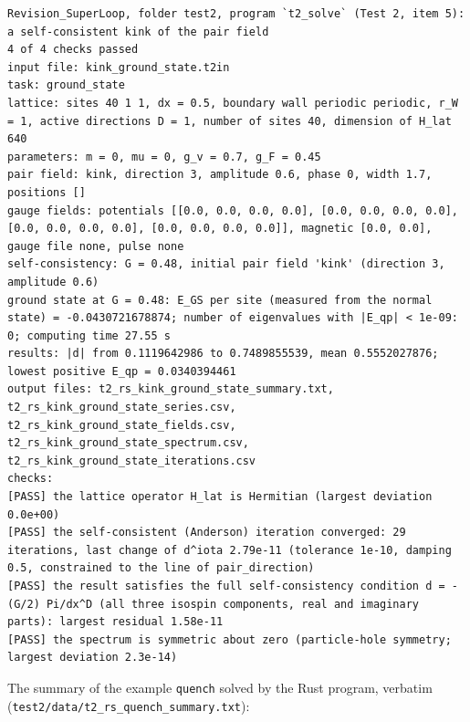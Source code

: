 \documentclass[
  10pt,
]{article}
\begin{document}
\begin{verbatim}
Revision_SuperLoop, folder test2, program `t2_solve` (Test 2, item 5): a self-consistent kink of the pair field
4 of 4 checks passed
input file: kink_ground_state.t2in
task: ground_state
lattice: sites 40 1 1, dx = 0.5, boundary wall periodic periodic, r_W = 1, active directions D = 1, number of sites 40, dimension of H_lat 640
parameters: m = 0, mu = 0, g_v = 0.7, g_F = 0.45
pair field: kink, direction 3, amplitude 0.6, phase 0, width 1.7, positions []
gauge fields: potentials [[0.0, 0.0, 0.0, 0.0], [0.0, 0.0, 0.0, 0.0], [0.0, 0.0, 0.0, 0.0], [0.0, 0.0, 0.0, 0.0]], magnetic [0.0, 0.0], gauge file none, pulse none
self-consistency: G = 0.48, initial pair field 'kink' (direction 3, amplitude 0.6)
ground state at G = 0.48: E_GS per site (measured from the normal state) = -0.0430721678874; number of eigenvalues with |E_qp| < 1e-09: 0; computing time 27.55 s
results: |d| from 0.1119642986 to 0.7489855539, mean 0.5552027876; lowest positive E_qp = 0.0340394461
output files: t2_rs_kink_ground_state_summary.txt, t2_rs_kink_ground_state_series.csv, t2_rs_kink_ground_state_fields.csv, t2_rs_kink_ground_state_spectrum.csv, t2_rs_kink_ground_state_iterations.csv
checks:
[PASS] the lattice operator H_lat is Hermitian (largest deviation 0.0e+00)
[PASS] the self-consistent (Anderson) iteration converged: 29 iterations, last change of d^iota 2.79e-11 (tolerance 1e-10, damping 0.5, constrained to the line of pair_direction)
[PASS] the result satisfies the full self-consistency condition d = -(G/2) Pi/dx^D (all three isospin components, real and imaginary parts): largest residual 1.58e-11
[PASS] the spectrum is symmetric about zero (particle-hole symmetry; largest deviation 2.3e-14)
\end{verbatim}

The summary of the example \texttt{quench} solved by the Rust program,
verbatim (\texttt{test2/data/t2\_rs\_quench\_summary.txt}):
\end{document}
